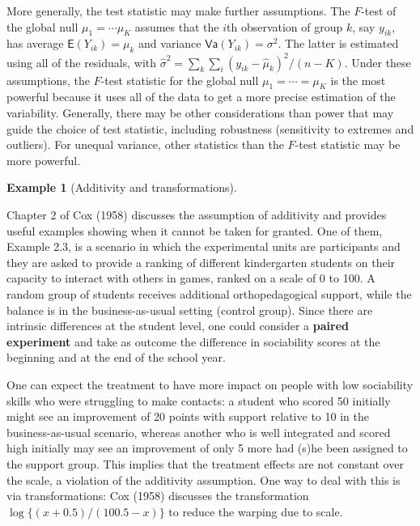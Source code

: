 \documentclass[
  11pt,
  letterpaper,
]{scrbook}
\theoremstyle{definition}
\theoremstyle{definition}
\newtheorem{example}{Example}[chapter]
\theoremstyle{remark}
\begin{document}
More generally, the test statistic may make further assumptions. The
\(F\)-test of the global null \(\mu_1 = \cdots \mu_K\) assumes that the
\(i\)th observation of group \(k\), say \(y_{ik}\), has average
\(\mathsf{E}(Y_{ik}) = \mu_k\) and variance
\(\mathsf{Va}(Y_{ik}) = \sigma^2\). The latter is estimated using all of
the residuals, with
\(\widehat{\sigma}^2 = \sum_k\sum_i (y_{ik} - \widehat{\mu}_k)^2/(n-K)\).
Under these assumptions, the \(F\)-test statistic for the global null
\(\mu_1 = \cdots = \mu_K\) is the most powerful because it uses all of
the data to get a more precise estimation of the variability. Generally,
there may be other considerations than power that may guide the choice
of test statistic, including robustness (sensitivity to extremes and
outliers). For unequal variance, other statistics than the \(F\)-test
statistic may be more powerful.

\begin{example}[Additivity and
transformations]\protect\hypertarget{exm-additivity-transfo}{}\label{exm-additivity-transfo}

Chapter 2 of Cox (1958) discusses the assumption of additivity and
provides useful examples showing when it cannot be taken for granted.
One of them, Example 2.3, is a scenario in which the experimental units
are participants and they are asked to provide a ranking of different
kindergarten students on their capacity to interact with others in
games, ranked on a scale of 0 to 100. A random group of students
receives additional orthopedagogical support, while the balance is in
the business-as-usual setting (control group). Since there are intrinsic
differences at the student level, one could consider a \textbf{paired
experiment} and take as outcome the difference in sociability scores at
the beginning and at the end of the school year.

One can expect the treatment to have more impact on people with low
sociability skills who were struggling to make contacts: a student who
scored 50 initially might see an improvement of 20 points with support
relative to 10 in the business-as-usual scenario, whereas another who is
well integrated and scored high initially may see an improvement of only
5 more had (s)he been assigned to the support group. This implies that
the treatment effects are not constant over the scale, a violation of
the additivity assumption. One way to deal with this is via
transformations: Cox (1958) discusses the transformation
\(\log\{(x+0.5)/(100.5-x)\}\) to reduce the warping due to scale.

\end{example}
\end{document}
